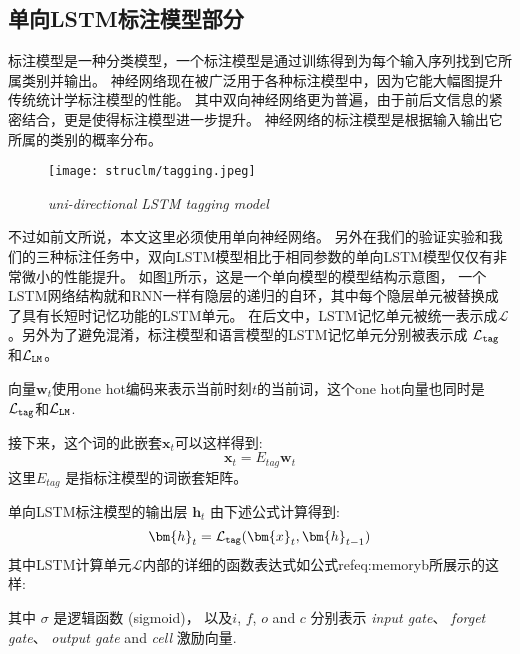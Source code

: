 \subsection{单向LSTM标注模型部分}
\label{sec:psd-ac-conf}
标注模型是一种分类模型，一个标注模型是通过训练得到为每个输入序列找到它所属类别并输出。
神经网络现在被广泛用于各种标注模型中\cite{schmid1994part}，因为它能大幅图提升传统统计学标注模型的性能。
其中双向神经网络更为普遍\cite{Wang2015A}，由于前后文信息的紧密结合，更是使得标注模型进一步提升。
神经网络的标注模型是根据输入输出它所属的类别的概率分布。



  \begin{figure}[tbhp!]
    \small
    \centering
    \texttt{[image: struclm/tagging.jpeg]}
    \caption{{\it uni-directional LSTM tagging model}}
    \label{fig:tagging}
  \end{figure}

不过如前文所说，本文这里必须使用单向神经网络。
另外在我们的验证实验和我们的三种标注任务中，双向LSTM模型相比于相同参数的单向LSTM模型仅仅有非常微小的性能提升。
如图\ref{fig:tagging}所示，这是一个单向模型的模型结构示意图，
一个LSTM网络结构就和RNN一样有隐层的递归的自环，其中每个隐层单元被替换成了具有长短时记忆功能的LSTM单元。
在后文中，LSTM记忆单元被统一表示成$\mathcal{L}$。另外为了避免混淆，标注模型和语言模型的LSTM记忆单元分别被表示成 $\mathcal{L}_{\tt{tag}}$和$\mathcal{L}_{\tt{LM}}$。



向量$\bm{w}_t$使用one hot编码来表示当前时刻$t$的当前词，这个one hot向量也同时是$\mathcal{L}_{\tt{tag}}$和$\mathcal{L}_{\tt{LM}}$.

接下来，这个词的此嵌套$\bm{x}_t$可以这样得到:
	\begin{equation}
    \bm{x}_t = E_{tag}\bm{w}_t
	\end{equation}
这里$E_{tag}$ 是指标注模型的词嵌套矩阵。    

单向LSTM标注模型的输出层 $\bm{h}_t$ 由下述公式计算得到:  
	\begin{equation}
    \bm{h}_t = \mathcal{L}_{\tt{tag}}(\bm{x}_t,\bm{h}_{t-1})
	\end{equation}
其中LSTM计算单元$\mathcal{L}$内部的详细的函数表达式如公式ref{eq:memoryb}所展示的这样:

其中 $\sigma$ 是逻辑函数 (sigmoid)， 以及$i$, $f$, $o$ and $c$ 分别表示 \textit{input gate}、 \textit{forget gate}、 \textit{output gate} and \textit{cell} 激励向量.



